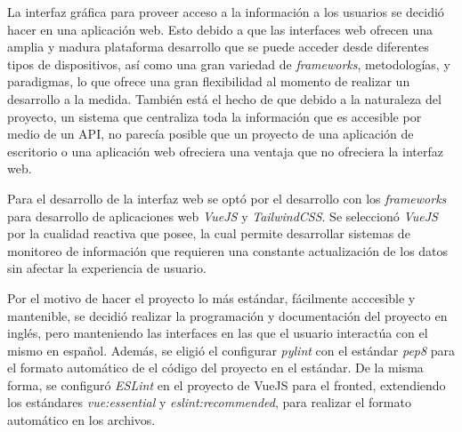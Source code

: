 La interfaz gráfica para proveer acceso a la información a los usuarios se decidió hacer en una aplicación web. Esto debido a que las interfaces web ofrecen una amplia y madura plataforma desarrollo que se puede acceder desde diferentes tipos de dispositivos, así como una gran variedad de \textit{frameworks}, metodologías, y paradigmas, lo que ofrece una gran flexibilidad al momento de realizar un desarrollo a la medida. También está el hecho de que debido a la naturaleza del proyecto, un sistema que centraliza toda la información que es accesible por medio de un API, no parecía posible que un proyecto de una aplicación de escritorio o una aplicación web ofreciera una ventaja que no ofreciera la interfaz web.

Para el desarrollo de la interfaz web se optó por el desarrollo con los \textit{frameworks} para desarrollo de aplicaciones web \textit{VueJS} y \textit{TailwindCSS}. Se seleccionó \textit{VueJS} por la cualidad reactiva que posee, la cual permite desarrollar sistemas de monitoreo de información que requieren una constante actualización de los datos sin afectar la experiencia de usuario.

Por el motivo de hacer el proyecto lo más estándar, fácilmente acccesible y mantenible, se decidió realizar la programación y documentación del proyecto en inglés, pero manteniendo las interfaces en las que el usuario interactúa con el mismo en español. Además, se eligió el configurar \textit{pylint} con el estándar \textit{pep8} para el formato automático de el código del proyecto en el estándar. De la misma forma, se configuró \textit{ESLint} en el proyecto de VueJS para el fronted, extendiendo los estándares \textit{vue:essential} y \textit{eslint:recommended}, para realizar el formato automático en los archivos.
